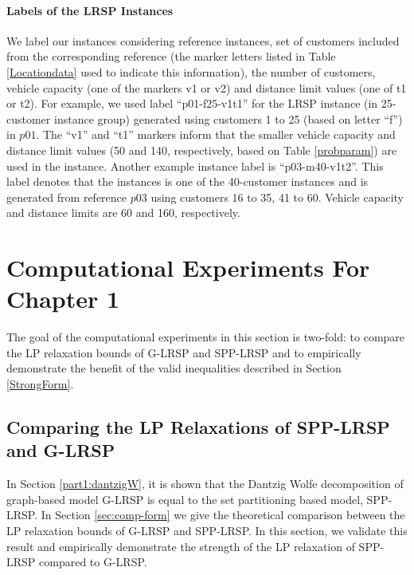 \paragraph{Labels of the LRSP Instances}
We label our instances considering reference \citet{Cordeau} instances,
set of customers included from the corresponding reference
(the marker letters listed in Table \ref{Locationdata} used to indicate this
information), the number of customers, vehicle capacity (one of the markers
v1 or v2) and distance limit values (one of t1 or t2).
For example, we used label ``p01-f25-v1t1'' for the
LRSP instance (in 25-customer instance group) generated using customers 1 to
25 (based on letter ``f'') in $p01$. The ``v1'' and ``t1'' markers inform that
the smaller vehicle capacity and distance limit values (50 and 140, respectively,
based on Table \ref{probparam}) are used in the instance. Another example instance
label is  ``p03-m40-v1t2''. This label denotes that the instances is one of the
40-customer instances and is generated from reference $p03$ using customers 16 to 35,
41 to 60. Vehicle capacity and distance limits are 60 and 160, respectively.

\section{Computational Experiments For Chapter 1}
The goal of the computational experiments in this section
is two-fold: to compare the LP relaxation bounds of G-LRSP and SPP-LRSP
and to empirically demonstrate the benefit of the valid inequalities described
in Section \ref{StrongForm}.

\subsection{Comparing the LP Relaxations of SPP-LRSP and G-LRSP}

In Section \ref{part1:dantzigW}, it is shown that the Dantzig Wolfe
decomposition of graph-based model G-LRSP is equal to the set
partitioning based model, SPP-LRSP. In Section \ref{sec:comp-form}
we give the theoretical comparison between the LP relaxation
bounds of G-LRSP and SPP-LRSP. In this section, we validate this
result and empirically demonstrate the strength of the LP relaxation of
SPP-LRSP compared to G-LRSP.

